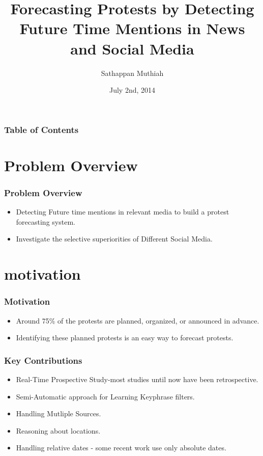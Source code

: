\documentclass{beamer}
\begin{document}
\title{Forecasting Protests by Detecting Future Time Mentions in News and Social Media
}
\author{Sathappan Muthiah}
\date{July 2nd, 2014}
\subject{Computer Science}


\frame{\titlepage}



\begin{frame}
\frametitle{Table of Contents}
\tableofcontents[currentsection]
\end{frame}


\section{Problem Overview}
\begin{frame}
    \frametitle{Problem Overview}
    \begin{itemize}
        \item
            Detecting Future time mentions in relevant media to build a protest forecasting system.
        \item
            Investigate the selective superiorities of Different Social Media.
    \end{itemize}
\end{frame}

\section{motivation}
\begin{frame}
    \frametitle{Motivation}
    \begin{itemize}
        \item
            Around 75\% of the protests are planned, organized, or announced in advance.
        \item
            Identifying these planned protests is an easy way to forecast protests.
    \end{itemize}
\end{frame}


\begin{frame}
    \frametitle{Key Contributions}
    \begin{itemize}
        \item
            Real-Time Prospective Study-most studies until now have been retrospective.
        \item
            Semi-Automatic approach for Learning Keyphrase filters.
        \item
            Handling Mutliple Sources.
        \item
            Reasoning about locations.
        \item
            Handling relative dates - some recent work use only absolute dates.
    \end{itemize}
\end{frame}
\end{document}
